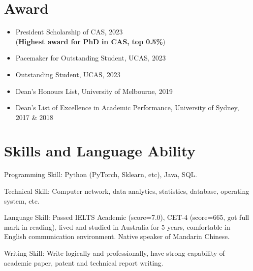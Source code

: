 \documentclass[letterpaper,10.9pt]{article}
\begin{document}
\section{\textbf{Award}}
\vspace{-5mm}
\begin{multicols}{2}
\begin{itemize}
  \setlength\itemsep{1.8pt}
  \item President Scholarship of CAS, 2023\\(\textbf{Highest award for PhD in CAS, top 0.5\%})
  \item Pacemaker for Outstanding Student, UCAS, 2023
  \item Outstanding Student, UCAS, 2023
  \item Dean's Honours List, University of Melbourne, 2019
  \item Dean's List of Excellence in Academic Performance, University of Sydney, 2017 \& 2018
\end{itemize}
\end{multicols}




\section{\textbf{Skills and Language Ability}}
Programming Skill: Python (PyTorch, Sklearn, etc), Java, SQL. 

Technical Skill: Computer network, data analytics, statistics, database, operating system, etc. 

Language Skill: Passed IELTS Academic (score=7.0), CET-4 (score=665, got full mark in reading), lived and studied in Australia for 5 years, comfortable in English communication environment. Native speaker of Mandarin Chinese. 

Writing Skill: Write logically and professionally, have strong capability of academic paper, patent and technical report writing. 
\end{document}
